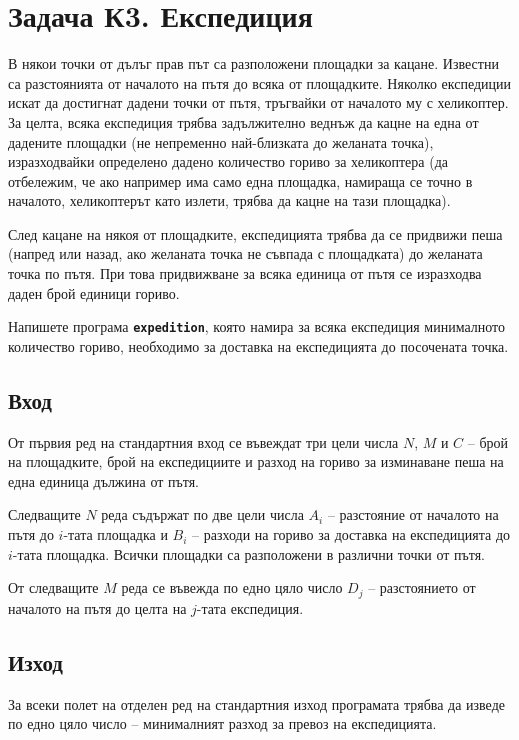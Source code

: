 \documentclass[12pt]{article}
\begin{document}
\section{Задача К3. Експедиция}

В някои точки от дълъг прав път са разположени площадки за кацане. Известни са разстоянията от началото на пътя до всяка от площадките. Няколко експедиции искат да достигнат дадени точки от пътя, тръгвайки от началото му с хеликоптер. За целта, всяка експедиция трябва задължително веднъж да кацне на една от дадените площадки (не непременно най-близката до желаната точка), изразходвайки определено дадено количество гориво за хеликоптера (да отбележим, че ако например има само една площадка, намираща се точно в началото, хеликоптерът като излети, трябва да кацне на тази площадка).

След кацане на някоя от площадките, експедицията трябва да се придвижи пеша (напред или назад, ако желаната точка не съвпада с площадката) до желаната точка по пътя. При това придвижване за всяка единица от пътя се изразходва даден брой единици гориво.

Напишете програма \texttt{\textbf{expedition}}, която намира за всяка експедиция минималното количество гориво, необходимо за доставка на експедицията до посочената точка.

\subsection{Вход}
От първия ред на стандартния вход се въвеждат три цели числа $N$, $M$ и $C$ -- брой на площадките, брой на експедициите и разход на гориво за изминаване пеша на една единица дължина от пътя.

Следващите $N$ реда съдържат по две цели числа $A_i$ -- разстояние от началото на пътя до $i$-тата площадка и $B_i$ -- разходи на гориво за доставка на експедицията до $i$-тата площадка. Всички площадки са разположени в различни точки от пътя. 

От следващите $M$ реда се въвежда по едно цяло число $D_j$ -- разстоянието от началото на пътя до целта на $j$-тата експедиция.

\subsection{Изход}
За всеки полет на отделен ред на стандартния изход програмата трябва да изведе по едно цяло число -- минималният разход за превоз на експедицията.
\end{document}
